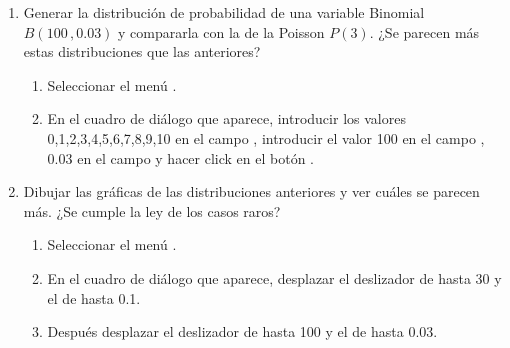 \begin{enumerate}[leftmargin=*]
\begin{enumerate}
\item Generar la distribución de probabilidad de una variable Binomial $B(100\,,0.03)$ y compararla con la de la
Poisson $P(3)$. ¿Se parecen más estas distribuciones que las anteriores? 
\begin{indicacion}
\begin{enumerate}
\item Seleccionar el menú .
\item En el cuadro de diálogo que aparece, introducir los valores 0,1,2,3,4,5,6,7,8,9,10 en el campo , introducir el valor 100 en el campo , $0.03$ en
el campo  y hacer click en el botón .
\end{enumerate}
\end{indicacion}

\item Dibujar las gráficas de las distribuciones anteriores y ver cuáles se parecen más. 
¿Se cumple la ley de los casos raros?
\begin{indicacion}
\begin{enumerate}
\item Seleccionar el menú .
\item En el cuadro de diálogo que aparece, desplazar el deslizador de  hasta 30 y el de  hasta 0.1.
\item Después desplazar el deslizador de  hasta 100 y el de  hasta 0.03.
\end{enumerate}
\end{indicacion}
\end{enumerate}
\end{enumerate}


